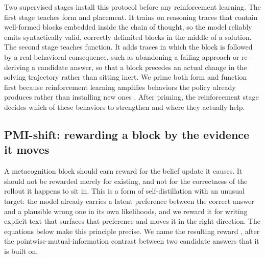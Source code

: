 Two supervised stages install this protocol before any reinforcement learning.
The first stage teaches form and placement. It trains on reasoning traces that
contain well-formed blocks embedded inside the chain of thought, so the model
reliably emits syntactically valid, correctly delimited blocks in the middle of
a solution. The second stage teaches function. It adds traces in which the block
is followed by a real behavioral consequence, such as abandoning a failing
approach or re-deriving a candidate answer, so that a block precedes an actual
change in the solving trajectory rather than sitting inert. We prime both form
and function first because reinforcement learning amplifies behaviors the policy
already produces rather than installing new ones \citep{gandhi2025cognitive}.
After priming, the reinforcement stage decides which of these behaviors to
strengthen and where they actually help.

\subsection{PMI-shift: rewarding a block by the evidence it moves}
\label{sec:method:pmishift}

A metacognition block should earn reward for the belief update it causes. It
should not be rewarded merely for existing, and not for the correctness of the
rollout it happens to sit in. This is a form of self-distillation with an unusual
target: the model already carries a latent preference between the correct answer
and a plausible wrong one in its own likelihoods, and we reward it for writing
explicit text that surfaces that preference and moves it in the right direction.
The equations below make this principle precise. We name the resulting reward
\pmishift{}, after the pointwise-mutual-information contrast between two candidate
answers that it is built on.

